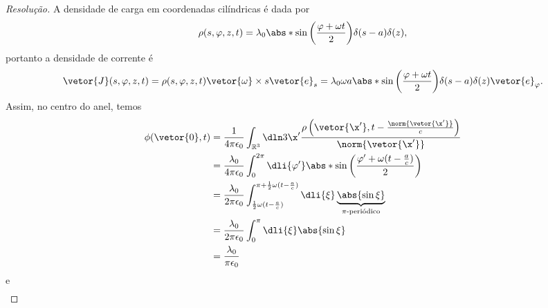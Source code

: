 \begin{proof}[Resolução]
   A densidade de carga em coordenadas cilíndricas é dada por 
   \begin{equation*}
      \rho(s, \varphi, z, t) = \lambda_0 \abs*{\sin\left(\frac{\varphi + \omega t}{2}\right)} \delta(s - a) \delta(z),
   \end{equation*}
   portanto a densidade de corrente é
   \begin{equation*}
      \vetor{J}(s, \varphi, z, t) = \rho(s, \varphi, z,t) \vetor{\omega} \times s \vetor{e}_s = \lambda_0 \omega a \abs*{\sin\left(\frac{\varphi + \omega t}{2}\right)} \delta(s - a) \delta(z) \vetor{e}_\varphi.
   \end{equation*}
   Assim, no centro do anel, temos
   \begin{align*}
      \phi(\vetor{0}, t) &= \frac{1}{4\pi \epsilon_0} \int_{\mathbb{R}^3} \dln3{\x'} \frac{\rho\left(\vetor{\x'}, t - \frac{\norm{\vetor{\x'}}}{c}\right)}{\norm{\vetor{\x'}}}\\
                         &= \frac{\lambda_0}{4\pi \epsilon_0} \int_{0}^{2\pi}\dli{\varphi'} \abs*{\sin\left(\frac{\varphi' + \omega (t - \frac{a}{c})}{2}\right)}\\
                         &= \frac{\lambda_0}{2\pi \epsilon_0} \int_{\frac12 \omega (t - \frac{a}{c})}^{\pi + \frac12 \omega (t - \frac{a}{c})} \dli{\xi} \underbrace{\abs{\sin\xi}}_{\pi\text{-periódico}}\\
                         &= \frac{\lambda_0}{2\pi \epsilon_0} \int_0^{\pi} \dli{\xi} \abs{\sin\xi}\\
                         &= \frac{\lambda_0}{\pi \epsilon_0}
   \end{align*}
   e
   \begin{align*}

\end{align*}
\end{proof}
